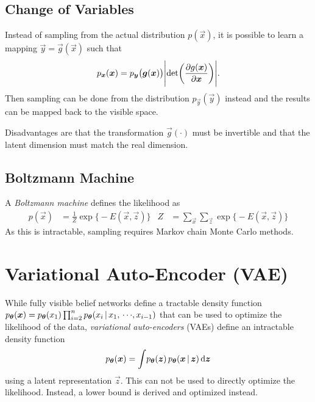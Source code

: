 		\subsection{Change of Variables}
			Instead of sampling from the actual distribution \( p(\vec{x}) \), it is possible to learn a mapping \( \vec{y} = \vec{g}(\vec{x}) \) such that
			\begin{equation}
				p_{\bm{x}}(\bm{x}) = p_{\bm{y}}\big( \bm{g}(\bm{x}) \big) \Biggl\lvert \det\biggl( \pdv{g(\bm{x})}{\bm{x}} \biggr) \Biggr\rvert.
			\end{equation}
			Then sampling can be done from the distribution \( p_{\vec{y}}(\vec{y}) \) instead and the results can be mapped back to the visible space.

			Disadvantages are that the transformation \(\vec{g}(\cdot)\) must be invertible and that the latent dimension must match the real dimension.

		\subsection{Boltzmann Machine}
			A \emph{Boltzmann machine} defines the likelihood as
			\begin{align}
				p(\vec{x}) &= \frac{1}{Z} \exp\bigl\{ -E(\vec{x}, \vec{z}) \bigr\} &
				Z &= \sum_{\vec{x}} \sum_{\vec{z}} \exp\bigl\{ -E(\vec{x}, \vec{z}) \bigr\}
			\end{align}
			As this is intractable, sampling requires Markov chain Monte Carlo methods.

	\section{Variational Auto-Encoder (VAE)}
		\label{sec:vae}

		While fully visible belief networks define a tractable density function \( p_{\bm{\theta}}(\bm{x}) = p_{\bm{\theta}}(x_1) \prod_{i = 2}^{n} p_{\bm{\theta}}(x_i \,\vert\, x_1,\,\cdots\!,x_{i - 1}) \) that can be used to optimize the likelihood of the data, \emph{variational auto-encoders} (VAEs) define an intractable density function
		\begin{equation}
			p_{\bm{\theta}}(\bm{x}) = \int\! p_{\bm{\theta}}(\bm{z}) \, p_{\bm{\theta}}(\bm{x} \,\vert\, \bm{z}) \dd{\bm{z}}
		\end{equation}
		using a latent representation \(\vec{z}\). This can not be used to directly optimize the likelihood. Instead, a lower bound is derived and optimized instead.

